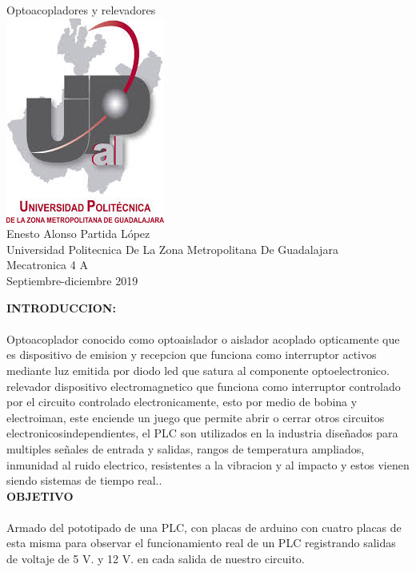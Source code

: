 \documentclass[12pt]{report}
\begin{document}
 
{\Huge Optoacopladores y relevadores}\\
\includegraphics[scale=1]{upzmg.jpg} \\
{\Huge Enesto Alonso Partida López\\ Universidad Politecnica De La Zona Metropolitana De Guadalajara\\ Mecatronica 4 A\\ Septiembre-diciembre 2019}
\date{3 de octubre 2019}
 
\newpage

{\huge \textbf{INTRODUCCION:}\\}\\


{\large Optoacoplador conocido como optoaislador o aislador acoplado opticamente que
es dispositivo de emision y recepcion que funciona como interruptor activos mediante
luz emitida por diodo led que satura al componente optoelectronico.
relevador dispositivo electromagnetico que funciona como interruptor controlado
por el circuito controlado electronicamente, esto por medio de bobina y
electroiman, este enciende un juego que permite abrir o cerrar otros circuitos
electronicosindependientes, el PLC son utilizados en la industria diseñados para
multiples señales de entrada y salidas, rangos de temperatura ampliados, inmunidad
al ruido electrico, resistentes a la vibracion y al impacto y estos vienen
siendo sistemas de tiempo real..}\\
 

{\huge \textbf{OBJETIVO}\\}\\


{\large Armado del pototipado de una PLC, con placas de arduino con cuatro placas de
esta misma para observar el funcionamiento real de un PLC registrando salidas
de voltaje de 5 V. y 12 V. en cada salida de nuestro circuito.}\\
\end{document}
